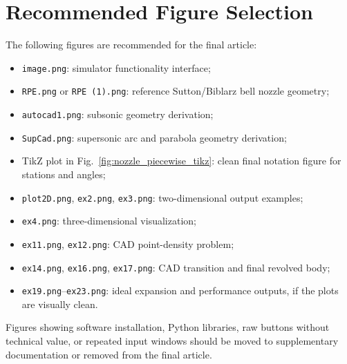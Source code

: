 \documentclass[journal,article,submit,oneauthor]{Definitions/mdpi}
\begin{document}
\appendixstart
\appendix
\section{Recommended Figure Selection}
The following figures are recommended for the final article:
\begin{itemize}
    \item \texttt{image.png}: simulator functionality interface;
    \item \texttt{RPE.png} or \texttt{RPE (1).png}: reference Sutton/Biblarz bell nozzle geometry;
    \item \texttt{autocad1.png}: subsonic geometry derivation;
    \item \texttt{SupCad.png}: supersonic arc and parabola geometry derivation;
    \item TikZ plot in Fig.~\ref{fig:nozzle_piecewise_tikz}: clean final notation figure for stations and angles;
    \item \texttt{plot2D.png}, \texttt{ex2.png}, \texttt{ex3.png}: two-dimensional output examples;
    \item \texttt{ex4.png}: three-dimensional visualization;
    \item \texttt{ex11.png}, \texttt{ex12.png}: CAD point-density problem;
    \item \texttt{ex14.png}, \texttt{ex16.png}, \texttt{ex17.png}: CAD transition and final revolved body;
    \item \texttt{ex19.png}--\texttt{ex23.png}: ideal expansion and performance outputs, if the plots are visually clean.
\end{itemize}

Figures showing software installation, Python libraries, raw buttons without technical value, or repeated input windows should be moved to supplementary documentation or removed from the final article.

\newpage
\backmatter


\end{document}
